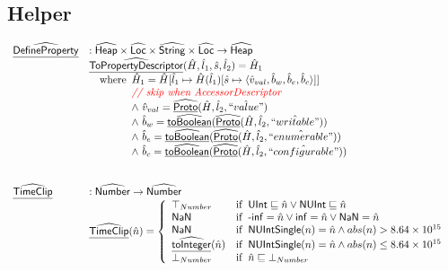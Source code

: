 \documentclass{article}
\newcommand{\SF}[1]{\mbox{\textsf{#1}}}
\newcommand{\comment}[1]{\textit{#1}}
\newcommand{\wherec}[1]{{\rm where}\begin{array}[t]{l}#1\end{array}}
\newcommand{\ifc}[1]{{\rm if}\begin{array}[t]{l}#1\end{array}}
\newcommand{\abs}[1]{\widehat{\SF{#1}}}
\newcommand{\ahf}[1]{\widehat{\underline{\sf #1}}}
\def\inred{\color{red}}
\def\inred{\color{red}}
\begin{document}
\subsection{Helper}
\[
\begin{array}{ll}

\ahf{DefineProperty} & : \abs{Heap} \times \abs{Loc} \times \abs{String} \times \abs{Loc} \rightarrow \abs{Heap} \\
& \ahf{ToPropertyDescriptor}(\hat{H}, \hat{l}_1, \hat{s}, \hat{l}_2 ) = \hat{H}_1\\
& \quad \wherec {
  \hat{H}_1 = \hat{H}[\hat{l}_1 \mapsto \hat{H}(\hat{l}_1)
    [\hat{s}\mapsto \langle \hat{v}_{val}, \hat{b}_{w}, \hat{b}_{e}, \hat{b}_{c}  \rangle]]\\
  \comment{{\inred // skip when AccessorDescriptor}}\\
  \land\ \hat{v}_{val} = \ahf{Proto}(\hat{H}, \hat{l}_2, \hat{``value"})\\
  \land\ \hat{b}_{w} = \ahf{toBoolean}(\ahf{Proto}(\hat{H}, \hat{l}_2, \hat{``writable"}))\\
  \land\ \hat{b}_{e} = \ahf{toBoolean}(\ahf{Proto}(\hat{H}, \hat{l}_2, \hat{``enumerable"}))\\    
  \land\ \hat{b}_{c} = \ahf{toBoolean}(\ahf{Proto}(\hat{H}, \hat{l}_2, \hat{``configurable"}))\\
  }\\
\\\\


\ahf{TimeClip} & : \abs{Number} \rightarrow \abs{Number} \\
& \ahf{TimeClip}(\hat{n}) = \left\{
      \begin{array}{ll}
        \top_{Number} & \ifc{\SF{UInt} \sqsubseteq \hat{n} \lor \SF{NUInt} \sqsubseteq \hat{n}}\\
        \SF{NaN} & \ifc{\SF{-inf} = \hat{n} \lor \SF{inf} = \hat{n} \lor \SF{NaN} = \hat{n}}\\
        \SF{NaN} & \ifc{\SF{NUIntSingle}(n) = \hat{n} \land abs(n) > 8.64 \times 10^{15}}\\
        \ahf{toInteger}(\hat{n}) & \ifc{\SF{NUIntSingle}(n) = \hat{n} \land abs(n) \leq 8.64 \times 10^{15}}\\
        \bot_{Number} & \ifc{\hat{n} \sqsubseteq \bot_{Number}}
      \end{array}
    \right.\\
\\
\end{array}
\]
\end{document}
